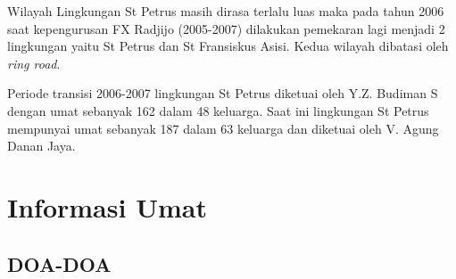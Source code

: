 \documentclass[a5paper,headsepline,titlepage,11pt,nnormalheadings,DIVcalc]{book}
\begin{document}
Wilayah Lingkungan St Petrus masih dirasa terlalu luas maka pada tahun 2006 saat kepengurusan FX Radjijo (2005-2007) dilakukan pemekaran lagi menjadi 2 lingkungan yaitu St Petrus dan St Fransiskus Asisi. Kedua wilayah dibatasi oleh {\it ring road}. 

Periode transisi 2006-2007 lingkungan St Petrus diketuai oleh Y.Z. Budiman S dengan umat sebanyak 162 dalam 48 keluarga. Saat ini lingkungan St Petrus mempunyai umat sebanyak 187 dalam 63 keluarga dan diketuai oleh V. Agung Danan Jaya.
 
\chapter*{Informasi Umat}




 
%
%
\section*{\large DOA-DOA}

\small

\normalsize


\end{document}
